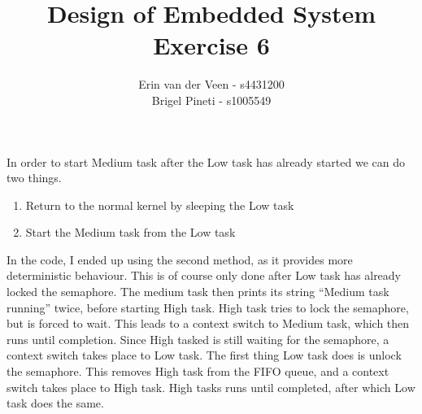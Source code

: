 \documentclass{scrartcl}
\title{Design of Embedded System\\Exercise 6}
\author{Erin van der Veen - s4431200\\
	Brigel Pineti - s1005549}
\begin{document}
\maketitle

In order to start Medium task after the Low task has already started we can do two things.
\begin{enumerate}
	\item Return to the normal kernel by sleeping the Low task
	\item Start the Medium task from the Low task
\end{enumerate}
In the code, I ended up using the second method, as it provides more deterministic behaviour.
This is of course only done after Low task has already locked the semaphore.
The medium task then prints its string ``Medium task running'' twice, before starting High task.
High task tries to lock the semaphore, but is forced to wait.
This leads to a context switch to Medium task, which then runs until completion.
Since High tasked is still waiting for the semaphore, a context switch takes place to Low task.
The first thing Low task does is unlock the semaphore.
This removes High task from the FIFO queue, and a context switch takes place to High task.
High tasks runs until completed, after which Low task does the same.
\end{document}
